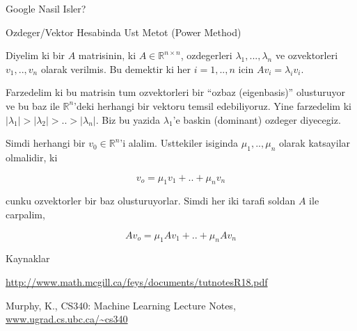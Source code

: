 \documentclass[12pt,fleqn]{article}\usepackage{../common}
\begin{document}
Google Nasil Isler? 

Ozdeger/Vektor Hesabinda Ust Metot (Power Method)

Diyelim ki bir $A$ matrisinin, ki $A \in \mathbb{R}^{n \times n}$,
ozdegerleri $\lambda_1,...,\lambda_n$ ve ozvektorleri $v_1,..,v_n$ olarak
verilmis. Bu demektir ki her $i=1,..,n$ icin $Av_i = \lambda_i v_i$.

Farzedelim ki bu matrisin tum ozvektorleri bir ``ozbaz (eigenbasis)''
olusturuyor ve bu baz ile $\mathbb{R}^n$'deki herhangi bir vektoru temsil
edebiliyoruz. Yine farzedelim ki $|\lambda_1| > |\lambda_2| > .. >
|\lambda_n| $. Biz bu yazida $\lambda_1$'e 
baskin (dominant) ozdeger diyecegiz.

Simdi herhangi bir $v_0 \in \mathbb{R}^n$'i alalim. Usttekiler isiginda
$\mu_1,..,\mu_n$ olarak katsayilar olmalidir, ki 

$$ v_o = \mu_1v_1 + .. + \mu_nv_n $$

cunku ozvektorler bir baz olusturuyorlar. Simdi her iki tarafi soldan $A$
ile carpalim, 

$$ A v_o = \mu_1 A v_1 + .. + \mu_n A v_n $$



Kaynaklar

\url{http://www.math.mcgill.ca/feys/documents/tutnotesR18.pdf}

Murphy, K., CS340: Machine Learning Lecture Notes, \url{www.ugrad.cs.ubc.ca/~cs340}
\end{document}
